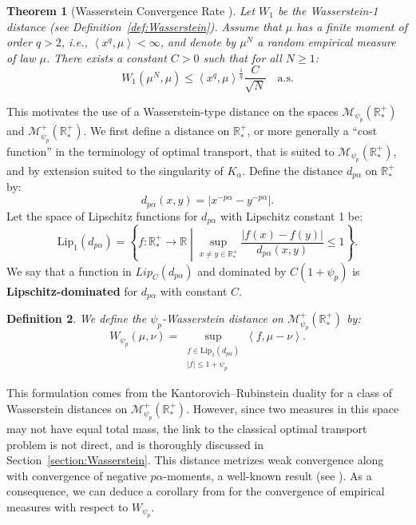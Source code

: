 \documentclass[11pt,a4paper]{article}
\newcommand{\RR}{\mathbb{R}}
\newcommand{\RRP}{\mathbb{R}^+_*}
\newcommand{\MC}{\mathcal{M}}
\newcommand{\brac}[1]{\left\langle#1\right\rangle}
\newtheorem{theorem}{Theorem}[section]
\newtheorem{definition}[theorem]{Definition}
\begin{document}
\begin{theorem}[Wasserstein Convergence Rate {\cite{fournier2015rate}}]\label{thm:fournier-guillin}
Let $W_1$ be the Wasserstein-1 distance (see Definition~\ref{def:Wasserstein}). Assume that $\mu$ has a finite moment of order $q > 2$, i.e., $\brac{x^q,\mu} < \infty$, and denote by $\mu^N$ a random empirical measure of law $\mu$. There exists a constant $C > 0$ such that for all $N \geq 1$:
\[
W_1\left(\mu^N, \mu\right) \leq \brac{x^q,\mu}^{\frac{1}{q}} \dfrac{C}{\sqrt{N}} \quad \text{a.s.}
\]
\end{theorem}

This motivates the use of a Wasserstein-type distance on the spaces $\MC_{\psi_p}(\RRP)$ and $\MC^+_{\psi_p}(\RRP)$. We first define a distance on $\RRP$, or more generally a “cost function” in the terminology of optimal transport, that is suited to $\MC_{\psi_p}(\RRP)$, and by extension suited to the singularity of $K_\alpha$. Define the distance $d_{p\alpha}$ on $\RRP$ by:
\[
d_{p\alpha}(x, y) = |x^{-p\alpha} - y^{-p\alpha}|.
\]
Let the space of Lipschitz functions for $d_{p\alpha}$ with Lipschitz constant 1 be:
\[
\text{Lip}_1(d_{p\alpha}) = \left\lbrace f: \RRP \to \RR \middle| \sup_{x \neq y \in \RRP} \dfrac{|f(x) - f(y)|}{d_{p\alpha}(x, y)} \leq 1 \right\rbrace.
\]
We say that a function in $Lip_C(d_{p\alpha})$ and dominated by $C(1 + \psi_p)$ is \textbf{Lipschitz-dominated} for $d_{p\alpha}$ with constant $C$.
\begin{definition}
We define the $\psi_p$-Wasserstein distance on $\MC^+_{\psi_p}\left(\RRP \right)$ by:
\[
W_{\psi_p}(\mu, \nu) = \sup_{\substack{f \in \text{Lip}_1(d_{p\alpha}) \\ |f| \leq 1 + \psi_p}} \brac{f, \mu - \nu}.
\]
\end{definition}

This formulation comes from the Kantorovich–Rubinstein duality for a class of Wasserstein distances on $\MC^+_{\psi_p}(\RRP)$. However, since two measures in this space may not have equal total mass, the link to the classical optimal transport problem is not direct, and is thoroughly discussed in Section~\ref{section:Wasserstein}. This distance metrizes weak convergence along with convergence of negative $p\alpha$-moments, a well-known result (see \cite{villani2008optimal}). As a consequence, we can deduce a corollary from \cite{fournier2015rate} for the convergence of empirical measures with respect to $W_{\psi_p}$.
\end{document}
